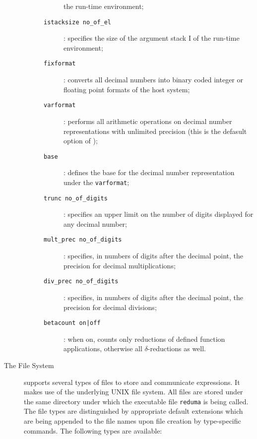 \begin{description}
\begin{description}
\begin{description}
the
run-time environment;
\item[{\tt istacksize no\_of\_el}]: specifies the size of the argument
stack I of the run-time environment;
\item[{\tt fixformat}]: converts all decimal numbers into binary coded
integer or floating point formats of the host system;
\item[{\tt varformat}]: performs all arithmetic operations on decimal
number representations with unlimited precision (this is the defasult
option of \pired);
\item[{\tt base}]: defines the base for the decimal number representation under the {\tt varformat};
\item[{\tt trunc no\_of\_digits}]: specifies an upper limit on the number of digits displayed for any decimal number;
\item[{\tt mult\_prec no\_of\_digits}]: specifies, in numbers of digits
after the decimal point, the precision for decimal multiplications;
\item[{\tt div\_prec no\_of\_digits}]: specifies, in numbers of digits
after the decimal point, the precision for decimal divisions;
\item[{\tt betacount on|off}]: when on, counts only reductions of defined function applications, otherwise all $\delta$-reductions as well.

\end{description}
\end{description}

\item[The File System] $\;$\\
\pired supports several types of files to store and communicate 
\kir expressions. It makes use of the underlying UNIX file system.
All files are stored under the same directory under which the
executable file {\tt reduma} is being called.
The file types are distinguished by appropriate default extensions
which are being appended to the file names upon file creation by
type-specific commands. The following types are available:


\end{description}
